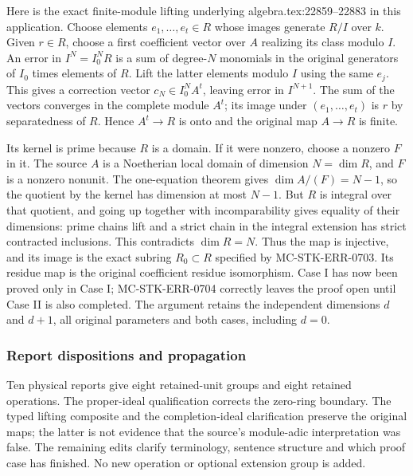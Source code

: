 Here is the exact finite-module lifting underlying algebra.\AlgebraIdentifierBreak{}tex:\AlgebraIdentifierBreak{}22859--\AlgebraIdentifierBreak{}22883 in this application. Choose elements \(e_1,\ldots,e_t\in R\) whose images generate \(R/I\) over \(k\). Given \(r\in R\), choose a first coefficient vector over \(A\) realizing its class modulo \(I\). An error in \(I^N=I_0^NR\) is a sum of degree-\(N\) monomials in the original generators of \(I_0\) times elements of \(R\). Lift the latter elements modulo \(I\) using the same \(e_j\). This gives a correction vector \(c_N\in I_0^N A^t\), leaving error in \(I^{N+1}\). The sum of the vectors converges in the complete module \(A^t\); its image under \((e_1,\ldots,e_t)\) is \(r\) by separatedness of \(R\). Hence \(A^t\to R\) is onto and the original map \(A\to R\) is finite.

Its kernel is prime because \(R\) is a domain. If it were nonzero, choose a nonzero \(F\) in it. The source \(A\) is a Noetherian local domain of dimension \(N=\dim R\), and \(F\) is a nonzero nonunit. The one-equation theorem gives \(\dim A/(F)=N-1\), so the quotient by the kernel has dimension at most \(N-1\). But \(R\) is integral over that quotient, and going up together with incomparability gives equality of their dimensions: prime chains lift and a strict chain in the integral extension has strict contracted inclusions. This contradicts \(\dim R=N\). Thus the map is injective, and its image is the exact subring \(R_0\subset R\) specified by MC-\AlgebraIdentifierBreak{}STK-\AlgebraIdentifierBreak{}ERR-\AlgebraIdentifierBreak{}0703. Its residue map is the original coefficient residue isomorphism. Case I has now been proved only in Case I; MC-\AlgebraIdentifierBreak{}STK-\AlgebraIdentifierBreak{}ERR-\AlgebraIdentifierBreak{}0704 correctly leaves the proof open until Case II is also completed. The argument retains the independent dimensions \(d\) and \(d+1\), all original parameters and both cases, including \(d=0\).

\subsubsection{Report dispositions and propagation}\label{algebra-proof-065-report-dispositions-and-propagation}

Ten physical reports give eight retained-unit groups and eight retained operations. The proper-ideal qualification corrects the zero-ring boundary. The typed lifting composite and the completion-ideal clarification preserve the original maps; the latter is not evidence that the source's module-adic interpretation was false. The remaining edits clarify terminology, sentence structure and which proof case has finished. No new operation or optional extension group is added.

